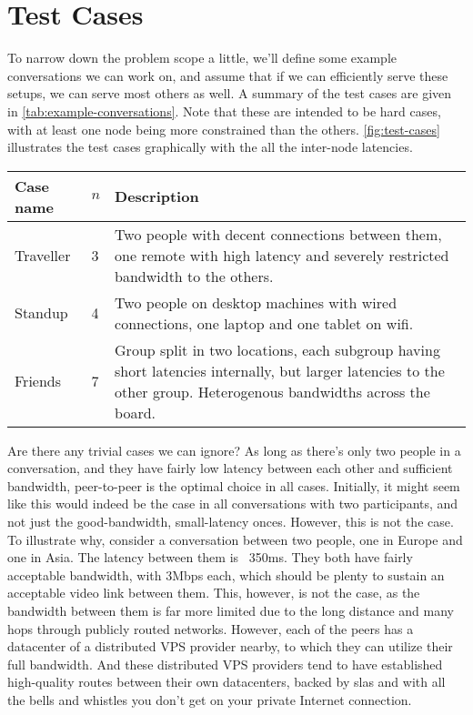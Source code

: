 \chapter{Test Cases}

To narrow down the problem scope a little, we'll define some example conversations we can work on, and assume that if we can efficiently serve these setups, we can serve most others as well. A summary of the test cases are given in \autoref{tab:example-conversations}. Note that these are intended to be hard cases, with at least one node being more constrained than the others. \autoref{fig:test-cases} illustrates the test cases graphically with the all the inter-node latencies.

\begin{center}
    \label{tab:example-conversations}
    \begin{tabular}{| l | l | p{7cm} |}
    \hline
    \textbf{Case name} & \textbf{$n$} & \textbf{Description} \\ \hline
    Traveller & 3 & Two people with decent connections between them, one remote with high latency and severely restricted bandwidth to the others. \\ \hline
    Standup & 4 & Two people on desktop machines with wired connections, one laptop and one tablet on wifi. \\ \hline
    Friends & 7 & Group split in two locations, each subgroup having short latencies internally, but larger latencies to the other group. Heterogenous bandwidths across the board. \\ \hline
    \end{tabular}
\end{center}

Are there any trivial cases we can ignore? As long as there's only two people in a conversation, and they have fairly low latency between each other and sufficient bandwidth, peer-to-peer is the optimal choice in all cases. Initially, it might seem like this would indeed be the case in all conversations with two participants, and not just the good-bandwidth, small-latency onces. However, this is not the case. To illustrate why, consider a conversation between two people, one in Europe and one in Asia. The latency between them is ~350ms. They both have fairly acceptable bandwidth, with 3Mbps each, which should be plenty to sustain an acceptable video link between them. This, however, is not the case, as the bandwidth between them is far more limited due to the long distance and many hops through publicly routed networks. However, each of the peers has a datacenter of a distributed VPS provider nearby, to which they can utilize their full bandwidth. And these distributed VPS providers tend to have established high-quality routes between their own datacenters, backed by \glspl{sla} and with all the bells and whistles you don't get on your private Internet connection.

